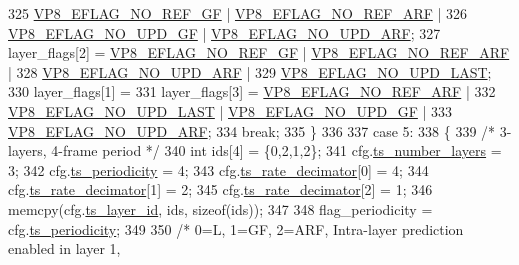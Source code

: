 \begin{DoxyCodeInclude}
{{{{{{{{{{{{{{{325                          \hyperlink{group__vp8__encoder_gabb5e95343a2738abef44eca13059da33}{VP8\_EFLAG\_NO\_REF\_GF} | 
      \hyperlink{group__vp8__encoder_ga650ab0baea12be91082226a5cc18776a}{VP8\_EFLAG\_NO\_REF\_ARF} |
326                          \hyperlink{group__vp8__encoder_gab01d066c5236457d345ce1cab4c41d6b}{VP8\_EFLAG\_NO\_UPD\_GF} | 
      \hyperlink{group__vp8__encoder_ga1cff46a5287e73a620660030d40b9e6c}{VP8\_EFLAG\_NO\_UPD\_ARF};
327         layer\_flags[2] = \hyperlink{group__vp8__encoder_gabb5e95343a2738abef44eca13059da33}{VP8\_EFLAG\_NO\_REF\_GF} | 
      \hyperlink{group__vp8__encoder_ga650ab0baea12be91082226a5cc18776a}{VP8\_EFLAG\_NO\_REF\_ARF} |
328                          \hyperlink{group__vp8__encoder_ga1cff46a5287e73a620660030d40b9e6c}{VP8\_EFLAG\_NO\_UPD\_ARF} |
329                          \hyperlink{group__vp8__encoder_ga602edb6b02a89cb2db7a16d6dffba583}{VP8\_EFLAG\_NO\_UPD\_LAST};
330         layer\_flags[1] =
331         layer\_flags[3] = \hyperlink{group__vp8__encoder_ga650ab0baea12be91082226a5cc18776a}{VP8\_EFLAG\_NO\_REF\_ARF} |
332                          \hyperlink{group__vp8__encoder_ga602edb6b02a89cb2db7a16d6dffba583}{VP8\_EFLAG\_NO\_UPD\_LAST} | 
      \hyperlink{group__vp8__encoder_gab01d066c5236457d345ce1cab4c41d6b}{VP8\_EFLAG\_NO\_UPD\_GF} |
333                          \hyperlink{group__vp8__encoder_ga1cff46a5287e73a620660030d40b9e6c}{VP8\_EFLAG\_NO\_UPD\_ARF};
334         \textcolor{keywordflow}{break};
335     \}
336 
337     \textcolor{keywordflow}{case} 5:
338     \{
339         \textcolor{comment}{/* 3-layers, 4-frame period */}
340         \textcolor{keywordtype}{int} ids[4] = \{0,2,1,2\};
341         cfg.\hyperlink{structvpx__codec__enc__cfg_a16d4549a30cbd585e3c3056ef873d8c7}{ts\_number\_layers}     = 3;
342         cfg.\hyperlink{structvpx__codec__enc__cfg_a4ec338780115dd270acf0dac24193474}{ts\_periodicity}       = 4;
343         cfg.\hyperlink{structvpx__codec__enc__cfg_ad40c30846ef8ef1d8684f10a491ec535}{ts\_rate\_decimator}[0] = 4;
344         cfg.\hyperlink{structvpx__codec__enc__cfg_ad40c30846ef8ef1d8684f10a491ec535}{ts\_rate\_decimator}[1] = 2;
345         cfg.\hyperlink{structvpx__codec__enc__cfg_ad40c30846ef8ef1d8684f10a491ec535}{ts\_rate\_decimator}[2] = 1;
346         memcpy(cfg.\hyperlink{structvpx__codec__enc__cfg_a4d105d2470dbfb7210b33d298f1cf1f6}{ts\_layer\_id}, ids, \textcolor{keyword}{sizeof}(ids));
347 
348         flag\_periodicity = cfg.\hyperlink{structvpx__codec__enc__cfg_a4ec338780115dd270acf0dac24193474}{ts\_periodicity};
349 
350         \textcolor{comment}{/* 0=L, 1=GF, 2=ARF, Intra-layer prediction enabled in layer 1,}
}}}}}}}}}}}}}}}
\end{DoxyCodeInclude}
